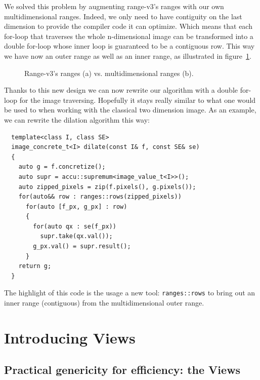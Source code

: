 We solved this problem by augmenting range-v3's ranges with our own multidimensional ranges. Indeed, we only need to
have contiguity on the last dimension to provide the compiler code it can optimize. Which means that each for-loop that
traverses the whole n-dimensional image can be transformed into a double for-loop whose inner loop is guaranteed to be a
contiguous row. This way we have now an outer range as well as an inner range, as illustrated in
figure~\ref{fig.inner.outer.range}.

\begin{figure}[htbp]
  \centering
  \caption{Range-v3's ranges (a) vs. multidimensional ranges (b).}
  \label{fig.inner.outer.range}
\end{figure}

Thanks to this new design we can now rewrite our algorithm with a double for-loop for the image traversing. Hopefully it
stays really similar to what one would be used to when working with the classical two dimension image. As an example, we
can rewrite the dilation algorithm this way:

\begin{verbatim}
  template<class I, class SE>
  image_concrete_t<I> dilate(const I& f, const SE& se)
  {
    auto g = f.concretize();
    auto supr = accu::supremum<image_value_t<I>>();
    auto zipped_pixels = zip(f.pixels(), g.pixels());
    for(auto&& row : ranges::rows(zipped_pixels))
      for(auto [f_px, g_px] : row)
      {
        for(auto qx : se(f_px))
          supr.take(qx.val());
        g_px.val() = supr.result();
      }
    return g;
  }
\end{verbatim}

The highlight of this code is the usage a new tool: \texttt{ranges::rows} to bring out an inner range (contiguous) from
the multidimensional outer range.


\section{Introducing Views}
\label{sec.views}

\subsection{Practical genericity for efficiency: the Views}
\label{subsec.views}

